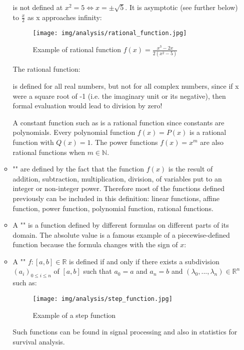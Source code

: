 \begin{enumerate}
\begin{itemize}
			is not defined at $x^2=5 \Leftrightarrow x=\pm \sqrt{5}$. It is asymptotic (see further below) to $\frac{x}{2}$ as x approaches infinity:
			\begin{figure}[H]
				\centering
				\texttt{[image: img/analysis/rational\_function.jpg]}
				\caption[Example of rational function]{Example of rational function $f(x) = \frac{x^3-2x}{2(x^2-5)}$}
			\end{figure}
			The rational function:
			
			 is defined for all real numbers, but not for all complex numbers, since if x were a square root of -1 (i.e. the imaginary unit or its negative), then formal evaluation would lead to division by zero!
			 
			 A constant function such as is a rational function since constants are polynomials. Every polynomial function $f(x) = P(x)$ is a rational function with $Q(x) = 1$. The power functions $f(x)=x^m$ are also rational functions when $m\in\mathbb{N}$.
			 
			 \item "" are defined by the fact that the function $f(x)$ is the result of addition, subtraction, multiplication, division, of variables put to an integer or non-integer power. Therefore most of the functions defined previously can be included in this definition: linear functions, affine function, power function, polynomial function, rational functions.
			 
			 \item A "" is a function defined by different formulas on different parts of its domain. The absolute value is a famous example of a piecewise-defined function because the formula changes with the sign of $x$:
			 
			 
			 \item A "" $f:[a,b]\in \mathbb{R}$ is defined if and only if there exists a subdivision $(a_i)_{0\leq i \leq n}$ of $[a, b]$ such that $a_0=a$ and $a_n=b$ and $(\lambda_0,...,\lambda_n)\in \mathbb{R}^n$ such as:
			 
			\begin{figure}[H]
				\centering
				\texttt{[image: img/analysis/step\_function.jpg]}
				\caption{Example of a step function}
			\end{figure}
			Such functions can be found in signal processing and also in statistics for survival analysis.
		\end{itemize}
		

\end{enumerate}

